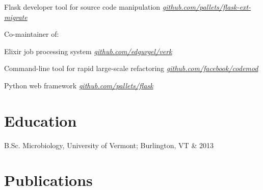 \documentclass[letterpaper]{scrartcl}
\begin{document}
\begin{list1}
\item
  \begin{list2}
  \item Flask developer tool for source code manipulation \hfill \href{https://github.com/pallets/flask-ext-migrate}{\emph{github.com/pallets/flask-ext-migrate}}

  \item Co-maintainer of:

    \begin{list3}
    \item Elixir job processing system \hfill \href{https://github.com/edgurgel/verk}{\emph{github.com/edgurgel/verk}}
    \item Command-line tool for rapid large-scale refactoring \hfill \href{https://github.com/facebook/codemod}{\emph{github.com/facebook/codemod}}
    \item Python web framework \hfill \href{https://github.com/pallets/flask}{\emph{github.com/pallets/flask}}
    \end{list3}

  \end{list2}
\end{list1}

%
%

\section*{Education}

\begin{list1}
  \item\begin{tabular1bold}B.Sc. Microbiology, University of Vermont; Burlington, VT & 2013\end{tabular1bold}
\end{list1}

%
%

\section*{Publications}
\end{document}
